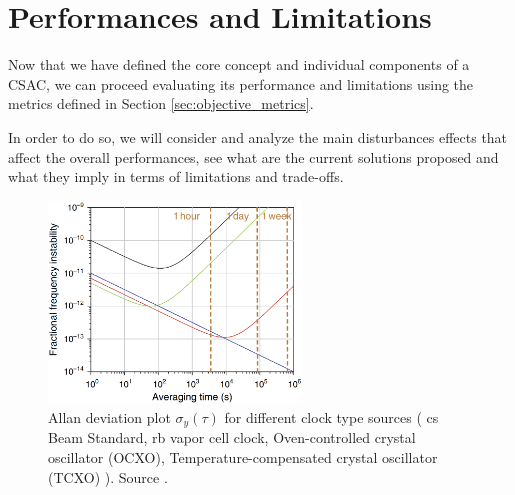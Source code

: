 \section{Performances and Limitations}
\label{sec:performances_and_limitations}

Now that we have defined the core concept and individual components of a CSAC, we can proceed evaluating its performance and limitations using the metrics defined in Section \ref{sec:objective_metrics}.

In order to do so, we will consider and analyze the main disturbances effects that affect the overall performances, see what are the current solutions proposed and what they imply in terms of limitations and trade-offs.

\begin{figure}[H]
    \centering
    \includegraphics[width=0.6\textwidth, max width=\linewidth]{img/allan-deviation-graph.png}
    \caption{
        Allan deviation plot $\sigma_y(\tau)$ for different clock type sources
        (%
        \textcolor[HTML]{0000FF}{\acrfull{cs} Beam Standard},
        \textcolor[HTML]{FF0000}{\acrfull{rb} vapor cell clock},
        \textcolor[HTML]{00FF00}{Oven-controlled crystal oscillator (OCXO)},
        \textcolor[HTML]{000000}{Temperature-compensated crystal oscillator (TCXO)}%
        ). Source \cite{Knappe}.
    }
    \label{fig:allan_deviation_graph}
\end{figure}

